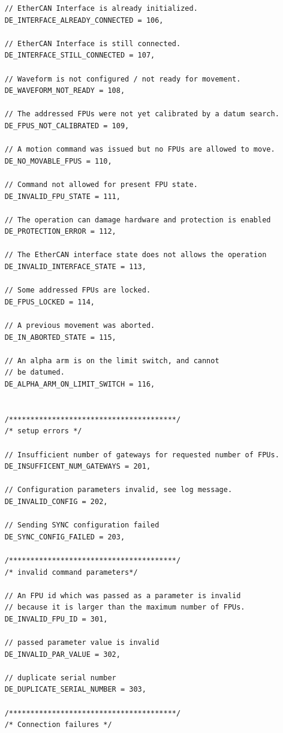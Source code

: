 \documentclass[fontsize=12,a4paper]{scrreprt}
\begin{document}
\begin{verbatim}
    // EtherCAN Interface is already initialized.
    DE_INTERFACE_ALREADY_CONNECTED = 106,

    // EtherCAN Interface is still connected.
    DE_INTERFACE_STILL_CONNECTED = 107,

    // Waveform is not configured / not ready for movement.
    DE_WAVEFORM_NOT_READY = 108,

    // The addressed FPUs were not yet calibrated by a datum search.
    DE_FPUS_NOT_CALIBRATED = 109,

    // A motion command was issued but no FPUs are allowed to move.
    DE_NO_MOVABLE_FPUS = 110,

    // Command not allowed for present FPU state.
    DE_INVALID_FPU_STATE = 111,

    // The operation can damage hardware and protection is enabled
    DE_PROTECTION_ERROR = 112,

    // The EtherCAN interface state does not allows the operation
    DE_INVALID_INTERFACE_STATE = 113,

    // Some addressed FPUs are locked.
    DE_FPUS_LOCKED = 114,

    // A previous movement was aborted.
    DE_IN_ABORTED_STATE = 115,

    // An alpha arm is on the limit switch, and cannot
    // be datumed.
    DE_ALPHA_ARM_ON_LIMIT_SWITCH = 116,


    /***************************************/
    /* setup errors */

    // Insufficient number of gateways for requested number of FPUs.
    DE_INSUFFICENT_NUM_GATEWAYS = 201,

    // Configuration parameters invalid, see log message.
    DE_INVALID_CONFIG = 202,

    // Sending SYNC configuration failed
    DE_SYNC_CONFIG_FAILED = 203,

    /***************************************/
    /* invalid command parameters*/

    // An FPU id which was passed as a parameter is invalid
    // because it is larger than the maximum number of FPUs.
    DE_INVALID_FPU_ID = 301,

    // passed parameter value is invalid
    DE_INVALID_PAR_VALUE = 302,

    // duplicate serial number
    DE_DUPLICATE_SERIAL_NUMBER = 303,

    /***************************************/
    /* Connection failures */


\end{verbatim}
\end{document}
